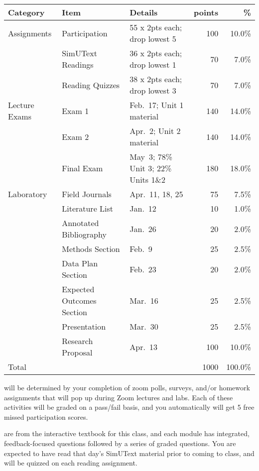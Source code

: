 \documentclass{tufte-handout}
\begin{document}
\begin{fullwidth}

\begin{table}
\begin{tabular}{l l l r r}
Category & Item & Details & points & \% \\
\hline
Assignments & Participation & 55 x 2pts each; drop lowest 5 & 100 & 10.0\% \\
& SimUText Readings   & 36 x 2pts each; drop lowest 1 & 70 & 7.0\% \\
& Reading Quizzes  & 38 x 2pts each; drop lowest 3 & 70 & 7.0\% \\
\hline
Lecture Exams & Exam 1 & Feb.~17; Unit 1 material & 140 & 14.0\% \\
& Exam 2 & Apr.~2; Unit 2 material & 140 & 14.0\% \\
& Final Exam & May~3; 78\% Unit 3; 22\% Units 1\&2 & 180 & 18.0\% \\ 		
\hline
Laboratory & Field Journals & Apr.~11, 18, 25 & 75 & 7.5\% \\
& Literature List & Jan.~12 & 10 & 1.0\% \\
& Annotated Bibliography & Jan.~26 & 20 & 2.0\% \\
& Methods Section & Feb.~9 & 25 & 2.5\% \\
& Data Plan Section & Feb.~23 & 20 & 2.0\% \\
& Expected Outcomes Section & Mar.~16 & 25 & 2.5\% \\
& Presentation & Mar.~30 & 25 & 2.5\% \\
& Research Proposal & Apr.~13 & 100 & 10.0\% \\
\hline
Total & & & 1000 & 100.0\% 
\end{tabular}
\end{table}




 will be determined by your completion of zoom polls, surveys, and/or homework assignments that will pop up during Zoom lectures and labs. Each of these activities will be graded on a pass/fail basis, and you automatically will get 5 free missed participation scores. 



 are from the interactive textbook for this class, and each module has integrated, feedback-focused questions followed by a series of graded questions. \color{blue}You are expected to have read that day's SimUText material prior to coming to class, and will be quizzed on each reading assignment. \color{black} 

\end{fullwidth}
\end{document}
